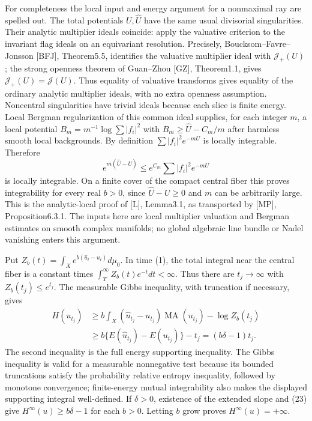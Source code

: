 \documentclass[11pt]{article}
\newcommand{\MA}{\operatorname{MA}}
\newcommand{\J}{\mathcal J}
\begin{document}
For completeness the local input and energy argument for a nonmaximal
ray are spelled out. The total potentials $U,\widehat U$ have the
same usual divisorial singularities. Their analytic multiplier ideals
coincide: apply the valuative criterion to the invariant flag ideals
on an equivariant resolution. Precisely, Boucksom--Favre--Jonsson
[BFJ], Theorem5.5, identifies the valuative multiplier ideal with
$\J_+(U)$; the strong openness theorem of Guan--Zhou [GZ],
Theorem1.1, gives $\J_+(U)=\J(U)$. Thus equality of valuative
transforms gives equality of the ordinary analytic multiplier ideals,
with no extra openness assumption. Noncentral singularities have trivial
ideals because each slice is finite energy. Local Bergman
regularization of this common ideal supplies, for each integer $m$,
a local potential $B_m=m^{-1}\log\sum|f_i|^2$ with
$B_m\geq\widehat U-C_m/m$ after harmless smooth local backgrounds.
By definition $\sum|f_i|^2e^{-mU}$ is locally integrable. Therefore
\[
 e^{m(\widehat U-U)}
          \leq e^{C_m}\sum|f_i|^2e^{-mU}
\]
is locally integrable. On a finite cover of the compact central fiber
this proves integrability for every real $b>0$, since
$\widehat U-U\geq0$ and $m$ can be arbitrarily large.
This is the analytic-local proof of [L], Lemma3.1, as transported by
[MP], Proposition6.3.1. The inputs here are local multiplier
valuation and Bergman estimates on smooth complex manifolds; no
global algebraic line bundle or Nadel vanishing enters this argument.

Put $Z_b(t)=\int_Xe^{b(\widehat u_t-u_t)}d\mu_0$. In time (1),
the total integral near the central fiber is a constant times
$\int_T^\infty Z_b(t)e^{-t}dt<\infty$.
Thus there are $t_j\to\infty$ with $Z_b(t_j)\leq e^{t_j}$.
The measurable Gibbs inequality, with truncation if necessary, gives
\[
 \begin{split}
 H(u_{t_j})&\geq b\int_X(\widehat u_{t_j}-u_{t_j})\MA(u_{t_j})
                                      -\log Z_b(t_j)\\
 &\geq b\{E(\widehat u_{t_j})-E(u_{t_j})\}-t_j
       =(b\delta-1)t_j.
 \end{split}                                                \tag{23}
\]
The second inequality is the full energy supporting inequality.
The Gibbs inequality is valid for a measurable nonnegative test
because its bounded truncations satisfy the probability relative
entropy inequality, followed by monotone convergence; finite-energy
mutual integrability also makes the displayed supporting integral
well-defined. If $\delta>0$, existence of the extended slope and
(23) give $H^\infty(u)\geq b\delta-1$ for each $b>0$.
Letting $b$ grow proves $H^\infty(u)=+\infty$.
\end{document}
